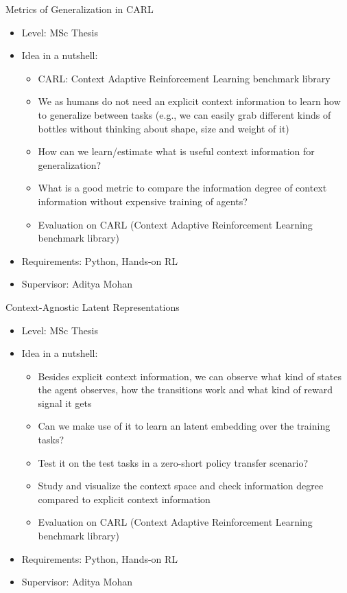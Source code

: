 \documentclass[aspectratio=169]{../latex_main/tntbeamer}  %
\begin{document}
\begin{frame}[c]{Metrics of Generalization in CARL}
	
    \begin{itemize}
		\item Level: MSc Thesis
		\item Idea in a nutshell:
		\begin{itemize}
		    \item CARL: Context Adaptive Reinforcement Learning benchmark library
		    \item We as humans do not need an explicit context information to learn how to generalize between tasks (e.g., we can easily grab different kinds of bottles without thinking about shape, size and weight of it)
		    \item How can we learn/estimate what is useful context information for generalization?
		    \item What is a good metric to compare the information degree of context information without expensive training of agents?
		    \item Evaluation on CARL (Context Adaptive Reinforcement Learning benchmark library)
		\end{itemize}
		\item Requirements: Python, Hands-on RL
		\item Supervisor: Aditya Mohan
	\end{itemize}
	
\end{frame}
\begin{frame}[c]{Context-Agnostic Latent Representations}
	
    \begin{itemize}
		\item Level: MSc Thesis
		\item Idea in a nutshell:
		\begin{itemize}
		    \item Besides explicit context information, we can observe what kind of states the agent observes, how the transitions work and what kind of reward signal it gets
		    \item Can we make use of it to learn an latent embedding over the training tasks?
		    \item Test it on the test tasks in a zero-short policy transfer scenario?
		    \item Study and visualize the context space and check information degree compared to explicit context information
		    \item Evaluation on CARL (Context Adaptive Reinforcement Learning benchmark library)
		\end{itemize}
		\item Requirements: Python, Hands-on RL
		\item Supervisor: Aditya Mohan
	\end{itemize}
	
\end{frame}
\end{document}
